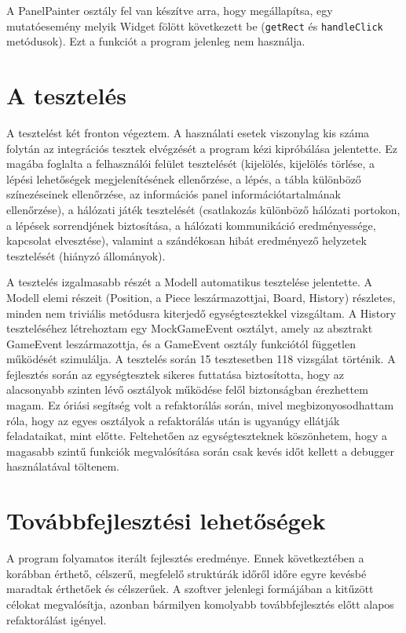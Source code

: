 \documentclass[12pt, twoside]{report}
\begin{document}
A PanelPainter osztály fel van készítve arra, hogy megállapítsa, egy mutatóesemény melyik Widget fölött következett be ({\tt getRect} és {\tt handleClick} metódusok). Ezt a funkciót a program jelenleg nem használja.

\section{A tesztelés}

A tesztelést két fronton végeztem. A használati esetek viszonylag kis száma folytán az integrációs tesztek elvégzését a program kézi kipróbálása jelentette. Ez magába foglalta a felhasználói felület tesztelését (kijelölés, kijelölés törlése, a lépési lehetőségek megjelenítésének ellenőrzése, a lépés, a tábla különböző színezéseinek ellenőrzése, az információs panel információtartalmának ellenőrzése), a hálózati játék tesztelését (csatlakozás különböző hálózati portokon, a lépések sorrendjének biztosítása, a hálózati kommunikáció eredményessége, kapcsolat elvesztése), valamint a szándékosan hibát eredményező helyzetek tesztelését (hiányzó állományok).

A tesztelés izgalmasabb részét a Modell automatikus tesztelése jelentette. A Modell elemi részeit (Position, a Piece leszármazottjai, Board, History) részletes, minden nem triviális metódusra kiterjedő egységtesztekkel vizsgáltam. A History teszteléséhez létrehoztam egy MockGameEvent osztályt, amely az absztrakt GameEvent leszármazottja, és a GameEvent osztály funkciótól független működését szimulálja. A tesztelés során 15 tesztesetben 118 vizsgálat történik. A fejlesztés során az egységtesztek sikeres futtatása biztosította, hogy az alacsonyabb szinten lévő osztályok működése felől biztonságban érezhettem magam. Ez óriási segítség volt a refaktorálás során, mivel megbizonyosodhattam róla, hogy az egyes osztályok a refaktorálás után is ugyanúgy ellátják feladataikat, mint előtte. Feltehetően az egységteszteknek köszönhetem, hogy a magasabb szintű funkciók megvalósítása során csak kevés időt kellett a debugger használatával töltenem.

\section{Továbbfejlesztési lehetőségek}

A program folyamatos iterált fejlesztés eredménye. Ennek következtében a korábban érthető, célszerű, megfelelő struktúrák időről időre egyre kevésbé maradtak érthetőek és célszerűek. A szoftver jelenlegi formájában a kitűzött célokat megvalósítja, azonban bármilyen komolyabb továbbfejlesztés előtt alapos refaktorálást igényel.
\end{document}
